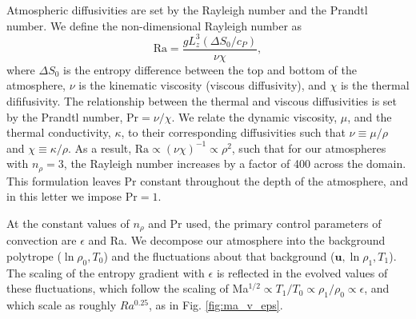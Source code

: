 \documentclass[aps, prl, twocolumn, groupedaddress, amsfonts, amssymb, amsmath]{revtex4-1}
\begin{document}
Atmospheric diffusivities are set by the Rayleigh number and the Prandtl number.  We define the
non-dimensional Rayleigh number as
\begin{equation}
\text{Ra} = \frac{g L_z^3 (\Delta S_0 / c_P)}{\nu\chi},
\end{equation}
where $\Delta S_0$ is the entropy difference between the top and bottom of the atmosphere, 
$\nu$ is the kinematic viscosity (viscous diffusivity), and $\chi$ is the thermal dififusivity.  
The relationship between the thermal and viscous diffusivities is
set by the Prandtl number, Pr$ = \nu/\chi$.   We relate the dynamic viscosity, $\mu$, and the thermal conductivity,
$\kappa$, to their corresponding diffusivities such that 
$\nu \equiv \mu/\rho$ and $\chi \equiv \kappa/\rho$.  As a result, $\text{Ra} \propto (\nu\chi)^{-1} \propto
\rho^2$, such that for our atmospheres with $n_{\rho} = 3$, the Rayleigh number increases by a factor of
400 across the domain.  This formulation leaves Pr
constant throughout the depth of the atmosphere, and in this letter we impose $\text{Pr} = 1$.

At the constant values of $n_\rho$ and Pr used, the primary control parameters of convection are $\epsilon$
and Ra.  We decompose our atmosphere into the background polytrope ($\ln\rho_{0}, T_{0}$) and the fluctuations
about that background ($\bm{u}, \ln\rho_{1}, T_{1}$).  The scaling of the entropy gradient with $\epsilon$
is reflected in the evolved values of these fluctuations, which follow the scaling of
Ma$^{1/2} \propto T_1/T_0 \propto \rho_{1}/\rho_{0} \propto \epsilon$, and which scale as roughly $Ra^{0.25}$,
as in Fig. \ref{fig:ma_v_eps}.
\end{document}
